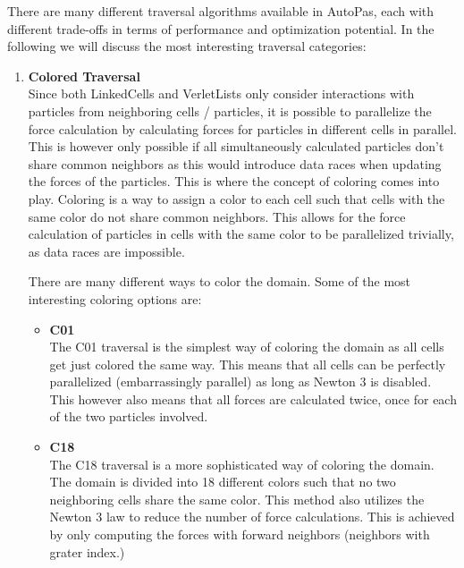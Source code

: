 \begin{enumerate}[label=\textbf{\arabic*.}]
            There are many different traversal algorithms available in AutoPas, each with different trade-offs in terms of performance and optimization potential. In the following we will discuss the most interesting traversal categories:


            \begin{enumerate}

                  \item \textbf{Colored Traversal} \\
                        Since both LinkedCells and VerletLists only consider interactions with particles from neighboring cells / particles, it is possible to parallelize the force calculation by calculating forces for particles in different cells in parallel. This is however only possible if all simultaneously calculated particles don't share common neighbors as this would introduce data races when updating the forces of the particles. This is where the concept of coloring comes into play. Coloring is a way to assign a color to each cell such that cells with the same color do not share common neighbors. This allows for the force calculation of particles in cells with the same color to be parallelized trivially, as data races are impossible.

                        There are many different ways to color the domain. Some of the most interesting coloring options are:
                        \begin{itemize}
                              \item \textbf{C01} \\
                                    The C01 traversal is the simplest way of coloring the domain as all cells get just colored the same way. This means that all cells can be perfectly parallelized (embarrassingly parallel) as long as Newton 3 is disabled. This however also means that all forces are calculated twice, once for each of the two particles involved.

                              \item \textbf{C18} \\
                                    The C18 traversal is a more sophisticated way of coloring the domain. The domain is divided into 18 different colors such that no two neighboring cells share the same color. This method also utilizes the Newton 3 law to reduce the number of force calculations. This is achieved by only computing the forces with forward neighbors (neighbors with grater index.) ~\cite{GRATL2022108262}


\end{itemize}
\end{enumerate}
\end{enumerate}
